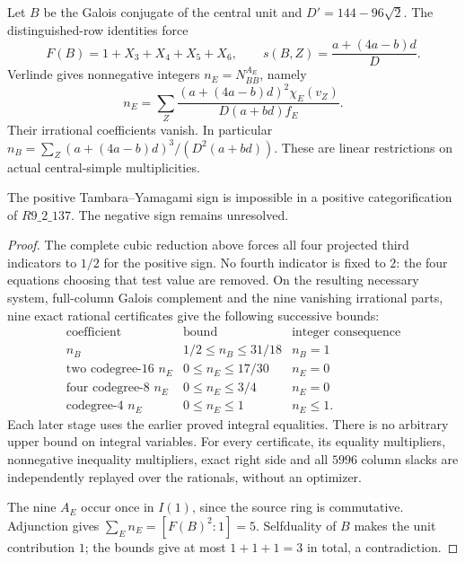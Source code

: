 Let $B$ be the Galois conjugate of the central unit and $D'=144-96\sqrt2$.
The distinguished-row identities force
\[
F(B)=1+X_3+X_4+X_5+X_6,\qquad
s(B,Z)=\frac{a+(4a-b)d}{D}.
\]
Verlinde gives nonnegative integers $n_E=N_{BB}^{A_E}$, namely
\[
n_E=\sum_Z
\frac{(a+(4a-b)d)^2\chi_E(v_Z)}{D(a+bd)f_E}.
\]
Their irrational coefficients vanish. In particular
$n_B=\sum_Z(a+(4a-b)d)^3/(D^2(a+bd))$.
These are linear restrictions on actual central-simple multiplicities.

\begin{theorem}\label{thm:r137-positive-ty-exclusion}
The positive Tambara--Yamagami sign is impossible in a positive
categorification of $R9\_2\_137$. The negative sign remains unresolved.
\end{theorem}
\begin{proof}
The complete cubic reduction above forces all four projected third
indicators to $1/2$ for the positive sign. No fourth indicator is fixed
to $2$: the four equations choosing that test value are removed.
On the resulting necessary system, full-column Galois complement and
the nine vanishing irrational parts, nine exact rational certificates
give the following successive bounds:
\[
\begin{array}{c|c|c}
\text{coefficient}&\text{bound}&\text{integer consequence}\\ \hline
n_B&1/2\le n_B\le31/18&n_B=1\\
\text{two codegree-16 }n_E&0\le n_E\le17/30&n_E=0\\
\text{four codegree-8 }n_E&0\le n_E\le3/4&n_E=0\\
\text{codegree-4 }n_E&0\le n_E\le1&n_E\le1 .
\end{array}
\]
Each later stage uses the earlier proved integral equalities.
There is no arbitrary upper bound on integral variables. For every
certificate, its equality multipliers, nonnegative inequality
multipliers, exact right side and all $5996$ column slacks are
independently replayed over the rationals, without an optimizer.

The nine $A_E$ occur once in $I(1)$, since the source ring is
commutative. Adjunction gives
$\sum_E n_E=[F(B)^2:1]=5$. Selfduality of $B$ makes the unit
contribution $1$; the bounds give at most $1+1+1=3$ in total,
a contradiction.
\end{proof}

